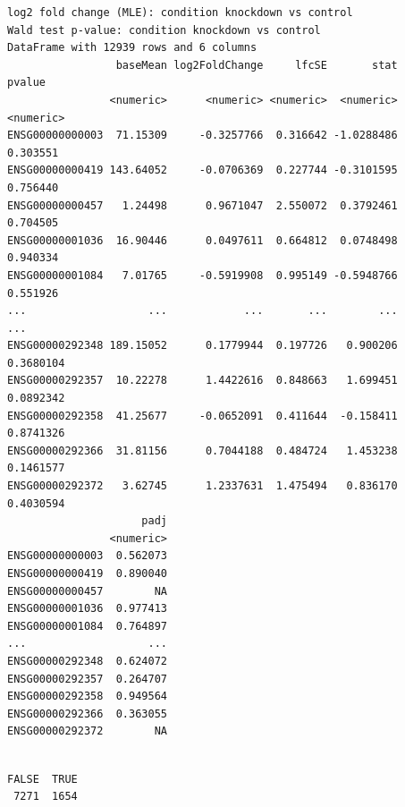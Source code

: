 \documentclass[
  letterpaper,
  DIV=11,
  numbers=noendperiod]{scrartcl}
\newenvironment{Shaded}{\begin{snugshade}}{\end{snugshade}}
\newcommand{\CommentTok}[1]{\textcolor[rgb]{0.37,0.37,0.37}{#1}}
\newcommand{\FloatTok}[1]{\textcolor[rgb]{0.68,0.00,0.00}{#1}}
\newcommand{\FunctionTok}[1]{\textcolor[rgb]{0.28,0.35,0.67}{#1}}
\newcommand{\NormalTok}[1]{\textcolor[rgb]{0.00,0.23,0.31}{#1}}
\newcommand{\SpecialCharTok}[1]{\textcolor[rgb]{0.37,0.37,0.37}{#1}}
\begin{document}
\begin{verbatim}
log2 fold change (MLE): condition knockdown vs control 
Wald test p-value: condition knockdown vs control 
DataFrame with 12939 rows and 6 columns
                 baseMean log2FoldChange     lfcSE       stat    pvalue
                <numeric>      <numeric> <numeric>  <numeric> <numeric>
ENSG00000000003  71.15309     -0.3257766  0.316642 -1.0288486  0.303551
ENSG00000000419 143.64052     -0.0706369  0.227744 -0.3101595  0.756440
ENSG00000000457   1.24498      0.9671047  2.550072  0.3792461  0.704505
ENSG00000001036  16.90446      0.0497611  0.664812  0.0748498  0.940334
ENSG00000001084   7.01765     -0.5919908  0.995149 -0.5948766  0.551926
...                   ...            ...       ...        ...       ...
ENSG00000292348 189.15052      0.1779944  0.197726   0.900206 0.3680104
ENSG00000292357  10.22278      1.4422616  0.848663   1.699451 0.0892342
ENSG00000292358  41.25677     -0.0652091  0.411644  -0.158411 0.8741326
ENSG00000292366  31.81156      0.7044188  0.484724   1.453238 0.1461577
ENSG00000292372   3.62745      1.2337631  1.475494   0.836170 0.4030594
                     padj
                <numeric>
ENSG00000000003  0.562073
ENSG00000000419  0.890040
ENSG00000000457        NA
ENSG00000001036  0.977413
ENSG00000001084  0.764897
...                   ...
ENSG00000292348  0.624072
ENSG00000292357  0.264707
ENSG00000292358  0.949564
ENSG00000292366  0.363055
ENSG00000292372        NA
\end{verbatim}

\begin{Shaded}
\end{Shaded}

\begin{verbatim}

FALSE  TRUE 
 7271  1654 
\end{verbatim}
\end{document}
